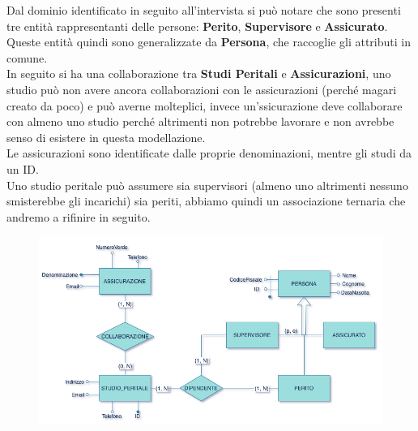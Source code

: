 \documentclass[a4paper,12pt]{report}
\begin{document}
\clearpage
Dal dominio identificato in seguito all’intervista si può notare che sono presenti tre entità rappresentanti delle persone: \textbf{Perito}, \textbf{Supervisore} e \textbf{Assicurato}.
\\
Queste entità quindi sono generalizzate da \textbf{Persona}, che raccoglie gli attributi in comune.
\\
In seguito si ha una collaborazione tra \textbf{Studi Peritali} e \textbf{Assicurazioni}, uno studio può non avere ancora collaborazioni con le assicurazioni (perché magari creato da poco) e può averne molteplici, invece un’ssicurazione deve collaborare con almeno uno studio perché altrimenti non potrebbe lavorare e non avrebbe senso di esistere in questa modellazione.
\\
Le assicurazioni sono identificate dalle proprie denominazioni, mentre gli studi da un ID. 
\\
Uno studio peritale può assumere sia supervisori (almeno uno altrimenti nessuno smisterebbe gli incarichi) sia periti, abbiamo quindi un associazione ternaria che andremo a rifinire in seguito.
\\
\begin{figure}[ht]
    \begin{center}
        \centering
        \includegraphics[width=\textwidth]{img/StudioPeritale.png}
    \end{center}
\end{figure}
\clearpage
\end{document}
